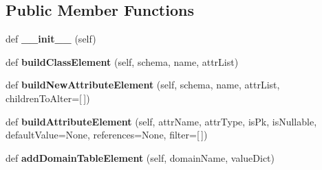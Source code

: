 \subsection*{Public Member Functions}
\begin{DoxyCompactItemize}
\item 
\mbox{\label{class_dsg_tools_1_1_postgis_customization_1_1_custom_j_s_o_n_tools_1_1custom_j_s_o_n_builder_1_1_custom_j_s_o_n_builder_aa212ff177239651e886fab473fbe9628}} 
def {\bfseries \+\_\+\+\_\+init\+\_\+\+\_\+} (self)
\item 
\mbox{\label{class_dsg_tools_1_1_postgis_customization_1_1_custom_j_s_o_n_tools_1_1custom_j_s_o_n_builder_1_1_custom_j_s_o_n_builder_acec849b65e3bdc96398ec02252a08742}} 
def {\bfseries build\+Class\+Element} (self, schema, name, attr\+List)
\item 
\mbox{\label{class_dsg_tools_1_1_postgis_customization_1_1_custom_j_s_o_n_tools_1_1custom_j_s_o_n_builder_1_1_custom_j_s_o_n_builder_aadf322af7e113a8c2a00ed8a343d2d92}} 
def {\bfseries build\+New\+Attribute\+Element} (self, schema, name, attr\+List, children\+To\+Alter=\mbox{[}$\,$\mbox{]})
\item 
\mbox{\label{class_dsg_tools_1_1_postgis_customization_1_1_custom_j_s_o_n_tools_1_1custom_j_s_o_n_builder_1_1_custom_j_s_o_n_builder_a0649d19cf8527c7efeb00b3cea8d74b5}} 
def {\bfseries build\+Attribute\+Element} (self, attr\+Name, attr\+Type, is\+Pk, is\+Nullable, default\+Value=None, references=None, filter=\mbox{[}$\,$\mbox{]})
\item 
\mbox{\label{class_dsg_tools_1_1_postgis_customization_1_1_custom_j_s_o_n_tools_1_1custom_j_s_o_n_builder_1_1_custom_j_s_o_n_builder_a2a901998a327686c017b7820fd646a50}} 
def {\bfseries add\+Domain\+Table\+Element} (self, domain\+Name, value\+Dict)

\end{DoxyCompactItemize}
